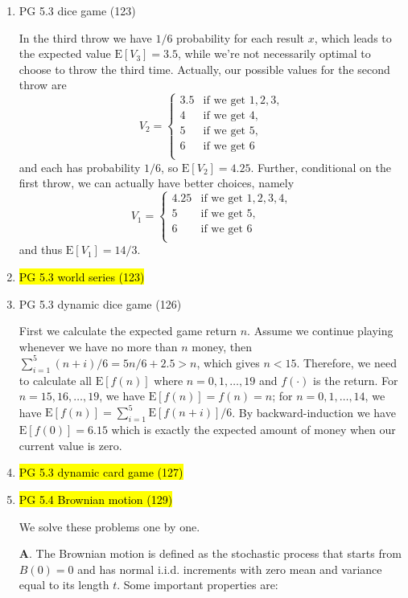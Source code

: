 \documentclass[11pt]{article}
\newcommand{\E}{\text{E}}
\newenvironment{note}{\begin{enumerate}[leftmargin=1em,topsep=0pt,noitemsep]}{\end{enumerate}}
\newcommand{\solution}{\boxed{\textbf{SOLUTION}}\hspace{.5em}}
\begin{document}
\begin{spacing}{1.1}
\begin{note}
\item PG 5.3 dice game (123)

\solution In the third throw we have $1/6$ probability for each result $x$, which leads to the expected value $\E[V_3]=3.5$, while we're not necessarily optimal to choose to throw the third time. Actually, our possible values for the second throw are
$$
V_2 = \begin{cases}
3.5 & \text{if we get $1,2,3$},\\
4 & \text{if we get $4$},\\
5 & \text{if we get $5$},\\
6 & \text{if we get $6$}\\
\end{cases}
$$
and each has probability $1/6$, so $\E[V_2]=4.25$. Further, conditional on the first throw, we can actually have better choices, namely
$$
V_1 = \begin{cases}
4.25 & \text{if we get $1,2,3,4$},\\
5 & \text{if we get $5$},\\
6 & \text{if we get $6$}\\
\end{cases}
$$
and thus $\E[V_1]=14/3$.

\item \hl{PG 5.3 world series (123)}

\item PG 5.3 dynamic dice game (126)

\solution First we calculate the expected game return $n$. Assume we continue playing whenever we have no more than $n$ money, then $\sum_{i=1}^5 (n+i)/6 = 5n/6 + 2.5 > n$, which gives $n < 15$. Therefore, we need to calculate all $\E[f(n)]$ where $n=0,1,\ldots,19$ and $f(\cdot)$ is the return. For $n=15,16,\ldots,19$, we have $\E[f(n)]=f(n)=n$; for $n=0,1,\ldots,14$, we have $\E[f(n)]=\sum_{i=1}^5 \E[f(n+i)]/6$. By backward-induction we have $\E[f(0)]=6.15$ which is exactly the expected amount of money when our current value is zero.

\item \hl{PG 5.3 dynamic card game (127)}

\item \hl{PG 5.4 Brownian motion (129)}

\solution We solve these problems one by one. 

\textbf{A}. The Brownian motion is defined as the stochastic process that starts from $B(0)=0$ and has normal i.i.d. increments with zero mean and variance equal to its length $t$. Some important properties are:


\end{note}
\end{spacing}
\end{document}
